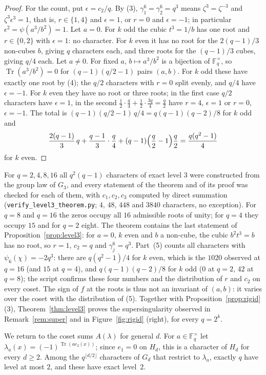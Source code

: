 \documentclass[11pt,a4paper]{amsart}
\theoremstyle{definition}
\theoremstyle{remark}
\newcommand{\F}{\mathbb{F}}
\newcommand{\Tr}{\operatorname{Tr}}
\begin{document}
\begin{proof}
For the count, put $\epsilon=c_2/q$. By (3), $\gamma_1^6=\gamma_2^6=q^3$ means $\zeta^3=\zeta^{-3}$ and
$\zeta^3\epsilon^3=1$, that is, $r\in\{1,4\}$ and $\epsilon=1$, or $r=0$ and $\epsilon=-1$; in particular
$\epsilon^2=\psi(a^3/b^2)=1$. Let $a=0$. For $k$ odd the cubic $t^3=1/b$ has one root and $r\in\{0,2\}$ with
$\epsilon=1$: no character. For $k$ even it has no root for the $2(q-1)/3$ non-cubes $b$, giving $q$ characters
each, and three roots for the $(q-1)/3$ cubes, giving $q/4$ each. Let $a\ne0$. For fixed $a$, $b\mapsto a^3/b^2$ is
a bijection of $\F_q^\times$, so $\Tr(a^3/b^2)=0$ for $(q-1)(q/2-1)$ pairs $(a,b)$. For $k$ odd these have exactly
one root by (4); the $q/2$ characters with $r=0$ split evenly, and $q/4$ have $\epsilon=-1$. For $k$ even they have
no root or three roots; in the first case $q/2$ characters have $\epsilon=1$, in the second
$\frac12\cdot\frac q4+\frac12\cdot\frac{3q}4=\frac q2$ have $r=4$, $\epsilon=1$ or $r=0$, $\epsilon=-1$. The total is
$(q-1)(q/2-1)\,q/4=q(q-1)(q-2)/8$ for $k$ odd and
\[
\frac{2(q-1)}3\,q+\frac{q-1}3\cdot\frac q4+(q-1)\Bigl(\frac q2-1\Bigr)\frac q2=\frac{q(q^2-1)}4
\]
for $k$ even.
\end{proof}

For $q=2,4,8,16$ all $q^2(q-1)$ characters of exact level $3$ were constructed from the group law of $G_3$, and
every statement of the theorem and of its proof was checked for each of them, with $c_1,c_2,c_3$ computed by direct
summation (\texttt{verify\_level3\_theorem.py}; $4$, $48$, $448$ and $3840$ characters, no exception). For $q=8$ and
$q=16$ the zeros occupy all $16$ admissible roots of unity; for $q=4$ they occupy $15$ and for $q=2$ eight. The
theorem contains the last statement of Proposition~\ref{prop:level3}: for $a=0$, $k$ even and $b$ a non-cube, the
cubic $b^2t^3=b$ has no root, so $r=1$, $c_2=q$ and $\gamma_j^6=q^3$. Part~(5) counts all characters with
$\psi_6(\chi)=-2q^3$: there are $q(q^2-1)/4$ for $k$ even, which is the $1020$ observed at $q=16$ (and $15$ at
$q=4$), and $q(q-1)(q-2)/8$ for $k$ odd ($0$ at $q=2$, $42$ at $q=8$); the script confirms these four numbers and
the distribution of $r$ and $c_2$ on every coset. The sign of $f$ at the roots is thus not an invariant of
$(a,b)$: it varies over the coset with the distribution of (5). Together with Proposition~\ref{prop:rigid}(3),
Theorem~\ref{thm:level3} proves the supersingularity observed in Remark~\ref{rem:super} and in
Figure~\ref{fig:rigid} (right), for every $q=2^k$.

\medskip
We return to the coset sums $A(\lambda)$ for general $d$. For $a\in\F_q^\times$ let
$\lambda_a(x)=(-1)^{\Tr(ae_2(x))}$; since $e_1=0$ on $H_d$, this is a character of $H_d$ for every $d\ge2$. Among the
$q^{\lfloor d/2\rfloor}$ characters of $G_d$ that restrict to $\lambda_a$, exactly $q$ have level at most $2$, and
these have exact level~$2$.
\end{document}
